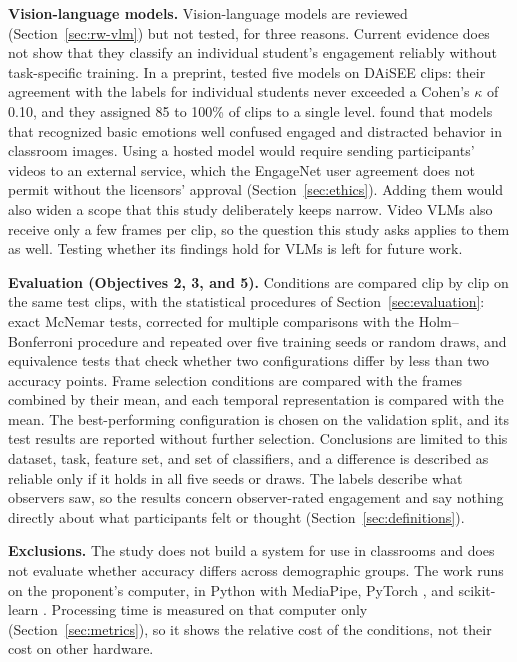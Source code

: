 \textbf{Vision-language models.} Vision-language models are reviewed (Section~\ref{sec:rw-vlm}) but not tested, for three reasons. Current evidence does not show that they classify an individual student's engagement reliably without task-specific training. In a preprint,  tested five models on DAiSEE clips: their agreement with the labels for individual students never exceeded a Cohen's $\kappa$ of 0.10, and they assigned 85 to 100\% of clips to a single level.  found that models that recognized basic emotions well confused engaged and distracted behavior in classroom images. Using a hosted model would require sending participants' videos to an external service, which the EngageNet user agreement does not permit without the licensors' approval (Section~\ref{sec:ethics}). Adding them would also widen a scope that this study deliberately keeps narrow. Video VLMs also receive only a few frames per clip, so the question this study asks applies to them as well. Testing whether its findings hold for VLMs is left for future work.

\textbf{Evaluation (Objectives 2, 3, and 5).} Conditions are compared clip by clip on the same test clips, with the statistical procedures of Section~\ref{sec:evaluation}: exact McNemar tests, corrected for multiple comparisons with the Holm--Bonferroni procedure and repeated over five training seeds or random draws, and equivalence tests that check whether two configurations differ by less than two accuracy points. Frame selection conditions are compared with the frames combined by their mean, and each temporal representation is compared with the mean. The best-performing configuration is chosen on the validation split, and its test results are reported without further selection. Conclusions are limited to this dataset, task, feature set, and set of classifiers, and a difference is described as reliable only if it holds in all five seeds or draws. The labels describe what observers saw, so the results concern observer-rated engagement and say nothing directly about what participants felt or thought (Section~\ref{sec:definitions}).

\textbf{Exclusions.} The study does not build a system for use in classrooms and does not evaluate whether accuracy differs across demographic groups. The work runs on the proponent's computer, in Python with MediaPipe, PyTorch \cite{paszke2019}, and scikit-learn \cite{pedregosa2011}. Processing time is measured on that computer only (Section~\ref{sec:metrics}), so it shows the relative cost of the conditions, not their cost on other hardware.


